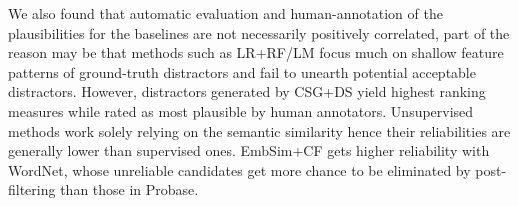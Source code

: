 We also found that automatic evaluation and human-annotation of
the plausibilities for the baselines are not necessarily 
positively correlated, part of the reason may be that methods such as LR+RF/LM focus much on shallow feature patterns of ground-truth distractors and fail to unearth potential acceptable distractors.
However, distractors generated by CSG+DS yield highest ranking measures while rated as most plausible by human annotators. 
Unsupervised methods work solely relying on the semantic similarity hence their reliabilities are generally lower than supervised ones. EmbSim+CF gets higher reliability with WordNet, whose unreliable candidates get more chance to be eliminated by post-filtering than those in Probase.


